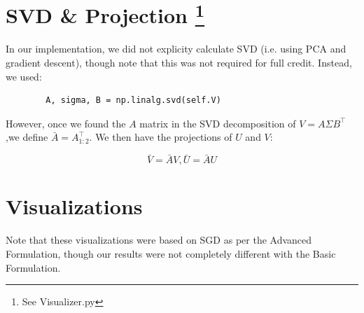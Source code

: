 \documentclass{article}
\begin{document}
\section*{SVD \& Projection \footnote{See Visualizer.py}}
In our implementation, we did not explicity calculate SVD (i.e. using PCA and
gradient descent), though note that this was not required for full credit.
Instead, we used:

\begin{verbatim}
        A, sigma, B = np.linalg.svd(self.V)
\end{verbatim}

\noindent However, once we found the $A$ matrix in the SVD decomposition of $V = A
\Sigma B^{\intercal}$,we define $\bar{A} = A_{1:2}^{\intercal}$. We then have
the projections of $U$ and $V$:

$$ \bar{V} = \bar{A} V, \bar{U} = \bar{A} U $$

\section*{Visualizations}
Note that these visualizations were based on SGD as per the Advanced Formulation,
though our results were not completely different with the Basic Formulation.
\end{document}
